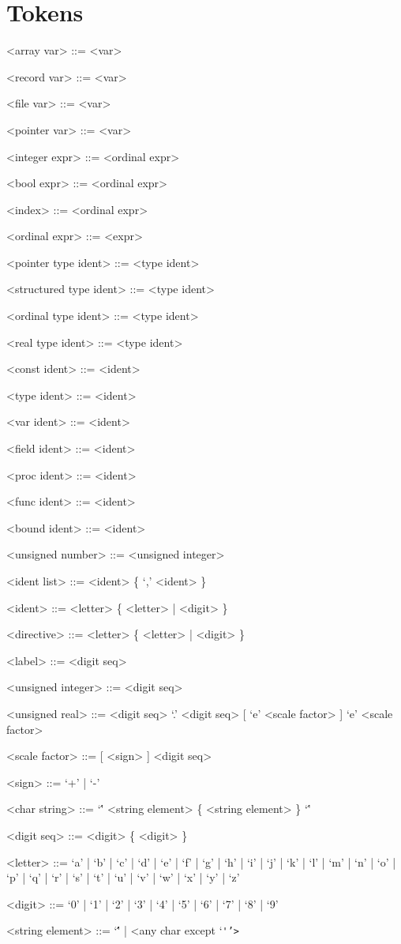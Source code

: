 \documentclass{article}
\begin{document}
\section{Tokens}

{
  \begin{grammar}
    <array var> ::= <var>
    
    <record var> ::= <var>
    
    <file var> ::= <var>
    
    <pointer var> ::= <var>

    <integer expr> ::= <ordinal expr>

    <bool expr> ::= <ordinal expr>

    <index> ::= <ordinal expr>

    <ordinal expr> ::= <expr>

    <pointer type ident> ::= <type ident>
    
    <structured type ident> ::= <type ident>
    
    <ordinal type ident> ::= <type ident>
    
    <real type ident> ::= <type ident>

    <const ident> ::= <ident>
    
    <type ident> ::= <ident>
    
    <var ident> ::= <ident>
    
    <field ident> ::= <ident>
    
    <proc ident> ::= <ident>
    
    <func ident> ::= <ident>
    
    <bound ident> ::= <ident>

    <unsigned number> ::= <unsigned integer> 

    <ident list> ::= <ident> \{ `,' <ident> \}

    <ident> ::= <letter> \{ <letter> | <digit> \}
    
    <directive> ::= <letter> \{ <letter> | <digit> \}

    <label> ::= <digit seq>

    <unsigned integer> ::= <digit seq>

    <unsigned real> ::= <digit seq> `.' <digit seq> [ `e' <scale factor> ]  `e' <scale factor>

    <scale factor> ::= [ <sign> ] <digit seq>

    <sign> ::= `+' | `-'

    <char string> ::= `\'' <string element> \{ <string element> \} `\''

    <digit seq> ::= <digit> \{ <digit> \}

    <letter> ::= `a' | `b' | `c' | `d' | `e' | `f' | `g' | `h' | `i' | `j' | `k' | `l' | `m' | `n' | `o' | `p' | `q' | `r' | `s' | `t' | `u' | `v' | `w' | `x' | `y' | `z'

    <digit> ::= `0' | `1' | `2' | `3' | `4' | `5' | `6' | `7' | `8' | `9'

    <string element> ::= `\'\'' | <any char except `\tt\'\normalfont'>
  \end{grammar}
}
\end{document}
